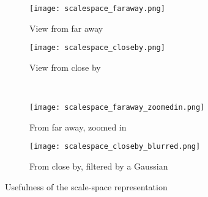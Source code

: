 \begin{figure}[H]
\centering
\begin{subfigure}{.4\textwidth}
  \centering
  \texttt{[image: scalespace\_faraway.png]}
  \caption{View from far away}
  \label{fig:scalespace_faraway}
\end{subfigure}%
\begin{subfigure}{.4\textwidth}
  \centering
  \texttt{[image: scalespace\_closeby.png]}
  \caption{View from close by}
  \label{fig:scalespace_closeby}
\end{subfigure} \\
\begin{subfigure}{.4\textwidth}
  \centering
  \texttt{[image: scalespace\_faraway\_zoomedin.png]}
  \caption{From far away, zoomed in}
  \label{fig:scalespace_faraway_zoomedin}
\end{subfigure}%
\begin{subfigure}{.4\textwidth}
  \centering
  \texttt{[image: scalespace\_closeby\_blurred.png]}
  \caption{From close by, filtered by a Gaussian}
  \label{fig:scalespace_closeby_blurred}
\end{subfigure}
\caption{Usefulness of the scale-space representation}
\label{fig:scalespace}
\end{figure}

